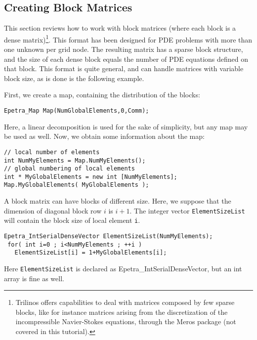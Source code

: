 \subsection{Creating Block Matrices}
\label{sec:sparse_vbr}

This section reviews how to work with block matrices (where each block
is a dense matrix)\footnote{Trilinos offers capabilities to deal with
  matrices composed by few sparse blocks, like for instance matrices
  arising from the discretization of the incompressible Navier-Stokes
  equations, through the Meros package (not covered in this tutorial).}.
This format has been designed for PDE problems with more than one
unknown per grid node.  The resulting matrix has a sparse block
structure, and the size of each dense block equals the number of PDE
equations defined on that block.  This format is quite general, and can
handle matrices with variable block size, as is done is the following
example.

First, we create a map, containing the distribution of the blocks:
\begin{verbatim}
Epetra_Map Map(NumGlobalElements,0,Comm);
\end{verbatim}
Here, a linear decomposition is used for the sake of simplicity, but any
map may be used as well.
Now, we obtain some information about the map:
\begin{verbatim}
// local number of elements
int NumMyElements = Map.NumMyElements();
// global numbering of local elements
int * MyGlobalElements = new int [NumMyElements];
Map.MyGlobalElements( MyGlobalElements );
\end{verbatim}
A block matrix can have blocks of different size.  Here, we suppose that
the dimension of diagonal block row $i$ is $i+1$.  The integer vector
\verb!ElementSizeList! will contain the block size of local element
\verb!i!.
\begin{verbatim}
Epetra_IntSerialDenseVector ElementSizeList(NumMyElements);
 for( int i=0 ; i<NumMyElements ; ++i ) 
   ElementSizeList[i] = 1+MyGlobalElements[i];
\end{verbatim}
Here \verb!ElementSizeList! is declared as Epetra\_IntSerialDenseVector,
but an int array is fine as well.

